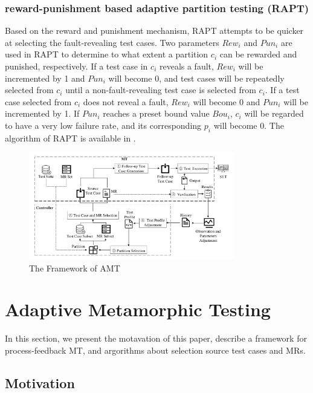\documentclass[10pt,journal,compsoc]{IEEEtran}
\begin{document}
\subsubsection{reward-punishment based adaptive partition testing (RAPT)}
\label{sec:rapt}

Based on the reward and punishment mechanism, RAPT attempts to be quicker at selecting the fault-revealing test cases. Two parameters $Rew_i$ and $Pun_i$ are used in RAPT to determine to what extent a partition $c_i$ can be rewarded and punished, respectively. If a test case in $c_i$ reveals a fault, $Rew_i$ will be incremented by 1 and $Pun_i$ will become 0, and test cases will be repeatedly selected from $c_i$ until a non-fault-revealing test case is selected from $c_i$. If a test case selected from $c_i$ does not reveal a fault, $Rew_i$ will become 0 and $Pun_i$ will be incremented by 1. If $Pun_i$ reaches a preset bound value $Bou_i$, $c_i$ will be regarded to have a very low failure rate, and its corresponding $p_i$ will become 0. The algorithm of RAPT is available in \cite{sun2018adaptive}.

\begin{figure}[htb]
  \centering
  \includegraphics[width = 0.8\textwidth]{fig//framework}
  \caption{The Framework of AMT}
  \label{fig:framework}
\end{figure}

\section{Adaptive Metamorphic Testing}
\label{sec:amt}
In this section, we present the motavation of this paper, describe a framework for process-feedback MT, and argorithms about selection source test cases and MRs.

\subsection{Motivation}
\label{sec:motavation}
\end{document}
